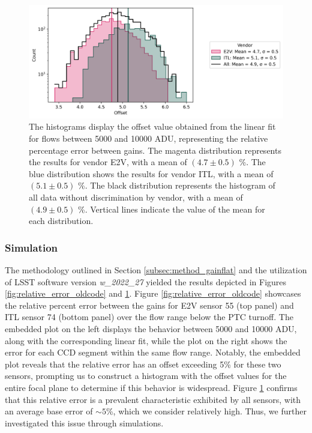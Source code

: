 \begin{figure}[!htb]
    \centering
    \includegraphics[width=\textwidth]{Figures/Histogram_offset_old.png}
    \caption{The histograms display the offset value obtained from the linear fit for flows between 5000 and 10000 ADU, representing the relative percentage error between gains. The magenta distribution represents the results for vendor E2V, with a mean of $(4.7 \pm 0.5)$ \%. The blue distribution shows the results for vendor ITL, with a mean of $(5.1 \pm 0.5)$ \%. The black distribution represents the histogram of all data without discrimination by vendor, with a mean of $(4.9 \pm 0.5)$ \%. Vertical lines indicate the value of the mean for each distribution.}
    \label{fig:hist_offset_old}
\end{figure}

\subsubsection{Simulation} \label{subsubsec:method_Simulation_Gain}

The methodology outlined in Section \ref{subsec:method_gainflat} and the utilization of LSST software version \textit{w\_2022\_27} yielded the results depicted in Figures \ref{fig:relative_error_oldcode} and \ref{fig:hist_offset_old}. Figure \ref{fig:relative_error_oldcode} showcases the relative percent error between the gains for E2V sensor 55 (top panel) and ITL sensor 74 (bottom panel) over the flow range below the PTC turnoff. The embedded plot on the left displays the behavior between 5000 and 10000 ADU, along with the corresponding linear fit, while the plot on the right shows the error for each CCD segment within the same flow range. Notably, the embedded plot reveals that the relative error has an offset exceeding 5\% for these two sensors, prompting us to construct a histogram with the offset values for the entire focal plane to determine if this behavior is widespread. Figure \ref{fig:hist_offset_old} confirms that this relative error is a prevalent characteristic exhibited by all sensors, with an average base error of $\sim 5$\%, which we consider relatively high. Thus, we further investigated this issue through simulations.

